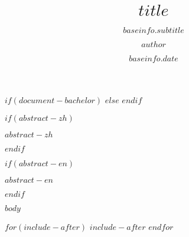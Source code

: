 \documentclass[a4paper,bachelor]{ructhesis}
\title{$title$} %
\author{$author$} %
\date{$baseinfo.date$} %
\subtitle{$baseinfo.subtitle$} %
\begin{document}
\maketitle

$if(document-bachelor)$
$else$
\originality %
$endif$

% 
$if(abstract-zh)$
\begin{abstractzh}
  $abstract-zh$
\end{abstractzh}
$endif$

% 
$if(abstract-en)$
\begin{abstracten}
  $abstract-en$
\end{abstracten}
$endif$


\frontmatter

\tableofcontents
\listoffigures
\listoftables


\mainmatter\clearpage
\pagestyle{fancy}

$body$

\newpage

\autograph




\nocite{*}

\appendix





$for(include-after)$
$include-after$
$endfor$
\end{document}
